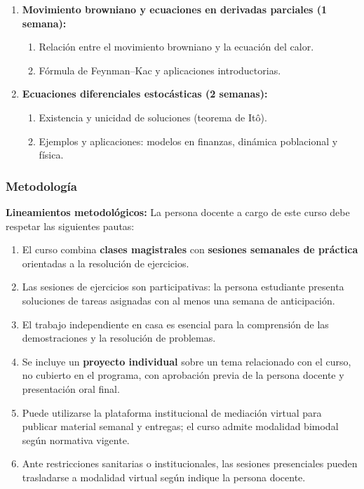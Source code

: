 \begin{refsection}
\begin{enumerate}
\item \textbf{Movimiento browniano y ecuaciones en derivadas parciales (1 semana):}
\begin{enumerate}
    \item Relación entre el movimiento browniano y la ecuación del calor.
    \item Fórmula de Feynman--Kac y aplicaciones introductorias.
\end{enumerate}

\item \textbf{Ecuaciones diferenciales estocásticas (2 semanas):}
\begin{enumerate}
    \item Existencia y unicidad de soluciones (teorema de Itô).
    \item Ejemplos y aplicaciones: modelos en finanzas, dinámica poblacional y física.
\end{enumerate}

\end{enumerate}

\subsubsection*{Metodología}

\noindent \textbf{Lineamientos metodológicos:} La persona docente a cargo de este curso debe respetar las siguientes pautas:

\begin{enumerate}
    \item El curso combina \textbf{clases magistrales} con \textbf{sesiones semanales de práctica} orientadas a la resolución de ejercicios.
    \item Las sesiones de ejercicios son participativas: la persona estudiante presenta soluciones de tareas asignadas con al menos una semana de anticipación.
    \item El trabajo independiente en casa es esencial para la comprensión de las demostraciones y la resolución de problemas.
    \item Se incluye un \textbf{proyecto individual} sobre un tema relacionado con el curso, no cubierto en el programa, con aprobación previa de la persona docente y presentación oral final.
    \item Puede utilizarse la plataforma institucional de mediación virtual para publicar material semanal y entregas; el curso admite modalidad bimodal según normativa vigente.
    \item Ante restricciones sanitarias o institucionales, las sesiones presenciales pueden trasladarse a modalidad virtual según indique la persona docente.
\end{enumerate}


\end{refsection}
